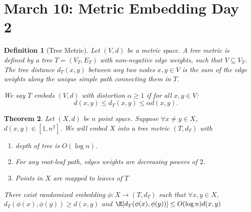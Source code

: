 \documentclass[a4paper]{article}
\newtheorem{thm}{Theorem}[section]
\newtheorem{defn}[thm]{Definition}
\begin{document}
\section{March 10: Metric Embedding Day 2}
\begin{defn}[Tree Metric]
    Let $(V,d)$ be a metric space. A tree metric is defined by a tree $T = (V_T, E_T)$ with non-negative edge weights, such that $V \subseteq V_T$. The tree distance $d_T(x,y)$ between any two nodes $x,y \in V$ is the sum of the edge weights along the unique simple path connecting them in $T$. 
    
    We say $T$ embeds $(V,d)$ with distortion $\alpha \geq 1$ if for all $x,y \in V$:
    \[
        d(x,y) \leq d_T(x,y) \leq \alpha d(x,y)
    .\]
\end{defn}
\begin{thm}
    Let $(X,d)$ be $n$ point space. Suppose $\forall x\neq y\in X$, $d(x,y)\in [1,n^2]$. We will embed $X$ into a tree metric $(T,d_T)$ with 
    \begin{enumerate}
        \item depth of tree is $O(\log n)$.
        \item For any root-leaf path, edges weights are decreasing powers of $2$.
        \item Points in $X$ are mapped to leaves of $T$
    \end{enumerate}
    There exist randomized embedding $\phi:X\to (T,d_T)$ such that $\forall x,y\in X$, $d_T(\phi(x),\phi(y))\geq d(x,y)$ and $\E[d_T(\phi(x),\phi(y))]\leq O(\log n)d(x,y)$
\end{thm}
\end{document}
